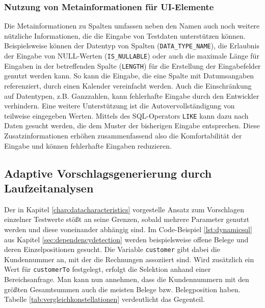\subsubsection{Nutzung von Metainformationen für UI-Elemente}
Die Metainformationen zu Spalten umfassen neben den Namen auch noch weitere nützliche Informationen, die die Eingabe von Testdaten unterstützen können.
Beispielsweise können der Datentyp von Spalten (\texttt{DATA\_TYPE\_NAME}), die Erlaubnis der Eingabe von NULL-Werten (\texttt{IS\_NULLABLE}) oder auch die maximale Länge für Eingaben in der betreffenden Spalte (\texttt{LENGTH}) für die Erstellung der Eingabefelder genutzt werden kann.
So kann die Eingabe, die eine Spalte mit Datumsangaben referenziert, durch einen Kalender vereinfacht werden.
Auch die Einschränkung auf Datentypen, z.B. Ganzzahlen, kann fehlerhafte Eingabe durch den Entwickler verhindern.
Eine weitere Unterstützung ist die Autovervollständigung von teilweise eingegeben Werten.
Mittels des SQL-Operators \texttt{LIKE} kann dazu nach Daten gesucht werden, die dem Muster der bisherigen Eingabe entsprechen.
Diese Zusatzinformationen erhöhen zusammenfassend also die Komfortabilität der Eingabe und können fehlerhafte Eingaben reduzieren.

\subsection{Adaptive Vorschlagsgenerierung durch Laufzeitanalysen}\label{chap:adaptive}
Der in Kapitel \ref{chap:datacharacteristics} vorgestelle Ansatz zum Vorschlagen einzelner Testwerte stößt an seine Grenzen, sobald mehrere Parameter genutzt werden und diese voneinander abhängig sind.
Im Code-Beispiel \ref{lst:dynamicsql} aus Kapitel \ref{sec:dependencydetection} werden beispielsweise offene Belege und deren Einzelpositionen gesucht.
Die Variable \texttt{customer} gibt dabei die Kundennummer an, mit der die Rechnungen assoziiert sind.
Wird zusätzlich ein Wert für \texttt{customerTo} festgelegt, erfolgt die Selektion anhand einer Bereichsanfrage.
Man kann nun annehmen, dass die Kundennummern mit den größten Gesamtsummen auch die meisten Belege bzw. Belegposition haben.
Tabelle \ref{tab:vergleichkonstellationen} verdeutlicht das Gegenteil.

